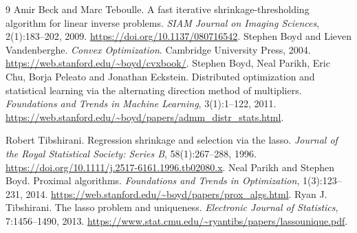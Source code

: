 \documentclass{article}
\begin{document}
\begin{thebibliography}{9}
Amir Beck and Marc Teboulle. A fast iterative shrinkage-thresholding algorithm for linear inverse problems. \emph{SIAM Journal on Imaging Sciences}, 2(1):183--202, 2009. \url{https://doi.org/10.1137/080716542}.
Stephen Boyd and Lieven Vandenberghe. \emph{Convex Optimization}. Cambridge University Press, 2004. \url{https://web.stanford.edu/~boyd/cvxbook/}.
Stephen Boyd, Neal Parikh, Eric Chu, Borja Peleato and Jonathan Eckstein. Distributed optimization and statistical learning via the alternating direction method of multipliers. \emph{Foundations and Trends in Machine Learning}, 3(1):1--122, 2011. \url{https://web.stanford.edu/~boyd/papers/admm_distr_stats.html}.

Robert Tibshirani. Regression shrinkage and selection via the lasso. \emph{Journal of the Royal Statistical Society: Series B}, 58(1):267--288, 1996. \url{https://doi.org/10.1111/j.2517-6161.1996.tb02080.x}.
Neal Parikh and Stephen Boyd. Proximal algorithms. \emph{Foundations and Trends in Optimization}, 1(3):123--231, 2014. \url{https://web.stanford.edu/~boyd/papers/prox_algs.html}.
Ryan J. Tibshirani. The lasso problem and uniqueness. \emph{Electronic Journal of Statistics}, 7:1456--1490, 2013. \url{https://www.stat.cmu.edu/~ryantibs/papers/lassounique.pdf}.
\end{thebibliography}
\end{document}
